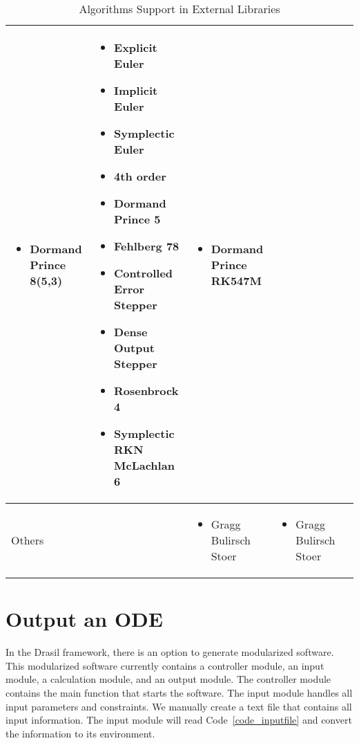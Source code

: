 \begin{sidewaystable}
\begin{adjustbox}{width=\columnwidth,center}
\begin{tabular}{p{} | p{} p{} p{} p{}}
\begin{itemize}[wide]
        \item Dormand Prince 8(5,3) 
        \end{itemize} & 
        \begin{itemize}[wide]
        \item Explicit Euler
        \item Implicit Euler
        \item Symplectic Euler
        \item 4th order
        \item Dormand Prince 5
        \item Fehlberg 78
        \item Controlled Error Stepper
        \item Dense Output Stepper
        \item Rosenbrock 4
        \item Symplectic RKN McLachlan 6
        \end{itemize} & 
        \begin{itemize}[wide]
        \item Dormand Prince RK547M
        \end{itemize} \\ \hline
    Others && 
        \begin{itemize}[wide]
        \item Gragg Bulirsch Stoer 
        \end{itemize} & 
        \begin{itemize}[wide]
        \item Gragg Bulirsch Stoer 
        \end{itemize} &\\
    \bottomrule	
\end{tabular}
\end{adjustbox}
\caption{Algorithms Support in External Libraries}	
\label{tab_algoexlib}
\end{sidewaystable}

\section{Output an ODE}
In the Drasil framework, there is an option to generate modularized software. This modularized software currently contains a controller module, an input module, a calculation module, and an output module. The controller module contains the main function that starts the software. The input module handles all input parameters and constraints. We manually create a text file that contains all input information. The input module will read Code~\ref{code_inputfile} and convert the information to its environment. 

